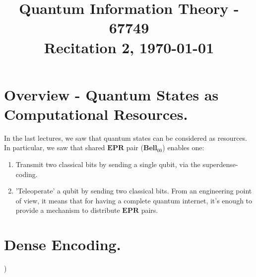\documentclass[12pt,a4paper]{article}
\title{ \begin{framed} Quantum Information Theory - 67749 \\ 
Recitation 2, \today \end{framed}  }
\date{\vspace{-5ex}}
\begin{document}
% 
 
\maketitle{ }    



\newcommand{\CCZ}{\textbf{CCZ}}
\newcommand{\CCX}{\textbf{CCX}}


\setcounter{enumcirc}{1} 


\newcommand{\advanceday}[1][21]{%
\begingroup
\AdvanceDate[#1]%
\today%
\endgroup
}%


\newcommand{\subqCircEx}[2]{\begin{subfigure}[t]{0.5\textwidth}
        \stepcounter{enumcirc} \caption*{ (\alph{enumcirc}) #1} \centering 
        #2
    \end{subfigure}
}

\newcommand{\qCircEx}[4]{\begin{figure*}[h!]
    \centering
    \subqCircEx{#1}{#2}
    ~ 
    \subqCircEx{#3}{#4}
\end{figure*}
}

\newcommand{\qCircExfullline}[2]{\begin{figure*}[h!]
    \stepcounter{enumcirc} \caption*{ (\alph{enumcirc}) #1}
        \centering 
        #2
\end{figure*}
}

\section{Overview - Quantum States as Computational Resources.}
In the last lectures, we saw that quantum states can be considered as resources. In particular, we saw that shared $\textbf{EPR}$ pair ($\textbf{Bell}_{00}$) enables one:
\begin{enumerate}
    \item Transmit two classical bits by sending a single qubit, via the superdense-coding. 
    \item 'Teleoperate' a qubit by sending two classical bits. From an engineering point of view, it means that for having a complete quantum internet, it's enough to provide a mechanism to distribute $\textbf{EPR}$ pairs.
\end{enumerate}


\section{Dense Encoding.} ) 
\end{document}
